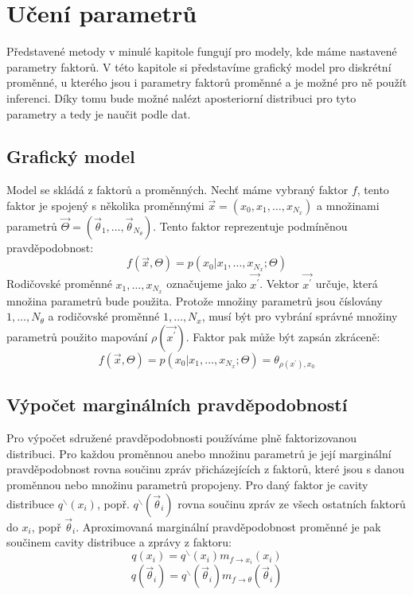 \chapter{Učení parametrů}
\label{ch:ep}

Představené metody v minulé kapitole fungují pro modely, kde máme nastavené parametry faktorů.
V této kapitole si představíme grafický model pro diskrétní proměnné, u kterého jsou i parametry faktorů proměnné a je možné pro ně použít inferenci.
Díky tomu bude možné nalézt aposteriorní distribuci pro tyto parametry a tedy je naučit podle dat.

\section{Grafický model}

Model se skládá z faktorů a proměnných.
Nechť máme vybraný faktor $f$, tento faktor je spojený s několika proměnnými
$\vec{x} = (x_0, x_1, \dots, x_{N_x})$
a množinami parametrů
$\vec{\Theta} = (\vec{\theta}_1, \dots, \vec{\theta}_{N_\theta})$.
Tento faktor reprezentuje podmíněnou pravděpodobnost:
$$f(\vec{x}, \Theta) = p(x_0 | x_1, \dots, x_{N_x}; \Theta)$$
Rodičovské proměnné $x_1, \dots, x_{N_x}$ označujeme jako $\vec{x^\prime}$.
Vektor $\vec{x^\prime}$ určuje, která množina parametrů bude použita.
Protože množiny parametrů jsou číslovány $1, \dots, N_\theta$ a rodičovské
proměnné $1, \dots, N_x$, musí být pro vybrání správné množiny parametrů
použito mapování $\rho(\vec{x^\prime})$.
Faktor pak může být zapsán zkráceně:
$$f(\vec{x}, \Theta) = p(x_0 | x_1, \dots, x_{N_x}; \Theta) =
\theta_{\rho(x^\prime), x_0}$$

\section{Výpočet marginálních pravděpodobností}

Pro výpočet sdružené pravděpodobnosti používáme plně faktorizovanou distribuci.
Pro každou proměnnou anebo množinu parametrů je její marginální pravděpodobnost
rovna součinu zpráv přicházejících z faktorů, které jsou s danou proměnnou
nebo množinu parametrů propojeny.
Pro daný faktor je cavity distribuce $q^\backslash(x_i)$, popř.
$q^\backslash(\vec{\theta}_i)$ rovna součinu zpráv ze všech ostatních faktorů do $x_i$, popř $\vec\theta_i$.
Aproximovaná marginální pravděpodobnost proměnné je pak součinem cavity
distribuce a zprávy z faktoru:
$$q(x_i) = q^\backslash(x_i) m_{f \rightarrow x_i}(x_i)$$
$$q(\vec{\theta}_i) = q^\backslash(\vec{\theta}_i) m_{f\rightarrow \theta}(\vec{\theta}_i)$$

